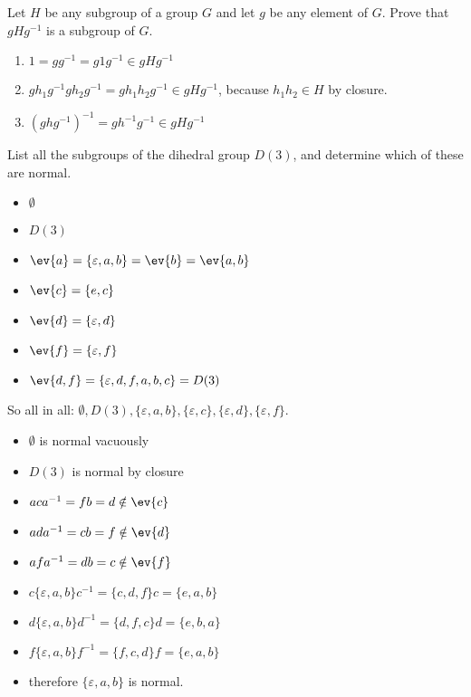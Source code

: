 \begin{exercise}
    Let \(H\) be any subgroup of a group \(G\) and let \(g\) be any element of \(G\). Prove that \(gHg^{ - 1}\) is a subgroup of \(G\).
\end{exercise}
\begin{solution}\itemfix
    \begin{enumerate}
        \item \(1 = gg^{ - 1} = g 1g^{ - 1} \in gHg^{ - 1}\)
        \item \(gh_1g^{ - 1}gh_2g^{ - 1} = gh_1h_2g^{ - 1} \in gHg^{ - 1}\), because \(h_1h_2 \in H\) by closure.
        \item \((ghg^{ - 1})^{ - 1} = gh^{ - 1}g^{ - 1} \in gHg^{ - 1}\)
    \end{enumerate}
\end{solution}

\begin{exercise}
    List all the subgroups of the dihedral group \(D(3)\), and determine which of these are normal.
\end{exercise}
\begin{solution}\itemfix
    \begin{itemize}
        \item \(\emptyset\)
        \item \(D(3)\)
        \item \(\ev{a} = \{\varepsilon, a, b\} = \ev{b} = \ev{a, b}\)
        \item \(\ev{c} = \{e, c\}\)
        \item \(\ev{d} = \{\varepsilon, d\}\)
        \item \(\ev{f} = \{\varepsilon, f\}\)
        \item \(\ev{d, f} = \{\varepsilon, d, f, a, b, c\} = D(3)\)
    \end{itemize}
    So all in all: \(\emptyset, D(3), \{\varepsilon, a, b\}, \{\varepsilon, c\}, \{\varepsilon, d\}, \{\varepsilon, f\}\).

    \begin{itemize}
        \item \(\emptyset\) is normal vacuously
        \item \(D(3)\) is normal by closure
        \item \(aca^{ - 1} = fb = d \notin \ev{c}\)
        \item \(ada^{ - 1} = c b = f \notin \ev{d}\)
        \item \(afa^{ - 1} = db = c \notin \ev{f}\)
        \item \(c \{\varepsilon, a, b\} c^{ - 1} = \{c, d, f\} c = \{e, a, b\}\)
        \item \(d \{\varepsilon, a, b\} d^{ - 1} = \{d, f, c\} d = \{e, b, a\}\)
        \item \(f \{\varepsilon, a, b\} f^{ - 1} = \{f, c, d\} f = \{e, a, b\}\)
        \item therefore \(\{\varepsilon, a, b\}\) is normal.
    \end{itemize}
\end{solution}

